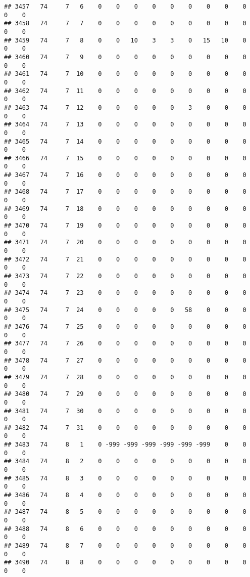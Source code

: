 \documentclass[]{article}
\begin{document}
\begin{verbatim}
## 3457   74     7   6    0    0    0    0    0    0    0    0    0    0    0
## 3458   74     7   7    0    0    0    0    0    0    0    0    0    0    0
## 3459   74     7   8    0    0   10    3    3    0   15   10    0    0    0
## 3460   74     7   9    0    0    0    0    0    0    0    0    0    0    0
## 3461   74     7  10    0    0    0    0    0    0    0    0    0    0    0
## 3462   74     7  11    0    0    0    0    0    0    0    0    0    0    0
## 3463   74     7  12    0    0    0    0    0    3    0    0    0    0    0
## 3464   74     7  13    0    0    0    0    0    0    0    0    0    0    0
## 3465   74     7  14    0    0    0    0    0    0    0    0    0    0    0
## 3466   74     7  15    0    0    0    0    0    0    0    0    0    0    0
## 3467   74     7  16    0    0    0    0    0    0    0    0    0    0    0
## 3468   74     7  17    0    0    0    0    0    0    0    0    0    0    0
## 3469   74     7  18    0    0    0    0    0    0    0    0    0    0    0
## 3470   74     7  19    0    0    0    0    0    0    0    0    0    0    0
## 3471   74     7  20    0    0    0    0    0    0    0    0    0    0    0
## 3472   74     7  21    0    0    0    0    0    0    0    0    0    0    0
## 3473   74     7  22    0    0    0    0    0    0    0    0    0    0    0
## 3474   74     7  23    0    0    0    0    0    0    0    0    0    0    0
## 3475   74     7  24    0    0    0    0    0   58    0    0    0    0    0
## 3476   74     7  25    0    0    0    0    0    0    0    0    0    0    0
## 3477   74     7  26    0    0    0    0    0    0    0    0    0    0    0
## 3478   74     7  27    0    0    0    0    0    0    0    0    0    0    0
## 3479   74     7  28    0    0    0    0    0    0    0    0    0    0    0
## 3480   74     7  29    0    0    0    0    0    0    0    0    0    0    0
## 3481   74     7  30    0    0    0    0    0    0    0    0    0    0    0
## 3482   74     7  31    0    0    0    0    0    0    0    0    0    0    0
## 3483   74     8   1    0 -999 -999 -999 -999 -999 -999    0    0    0    0
## 3484   74     8   2    0    0    0    0    0    0    0    0    0    0    0
## 3485   74     8   3    0    0    0    0    0    0    0    0    0    0    0
## 3486   74     8   4    0    0    0    0    0    0    0    0    0    0    0
## 3487   74     8   5    0    0    0    0    0    0    0    0    0    0    0
## 3488   74     8   6    0    0    0    0    0    0    0    0    0    0    0
## 3489   74     8   7    0    0    0    0    0    0    0    0    0    0    0
## 3490   74     8   8    0    0    0    0    0    0    0    0    0    0    0

\end{verbatim}
\end{document}
